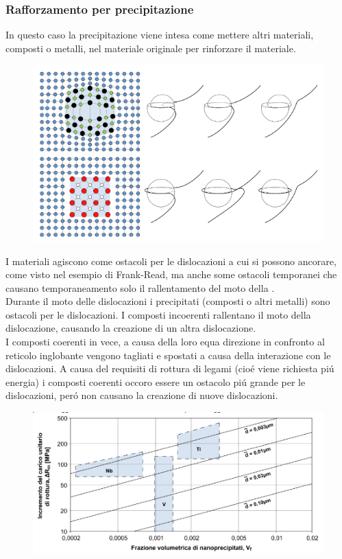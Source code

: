 \documentclass{article}
\begin{document}
            \subsubsection{Rafforzamento per precipitazione}
                In questo caso la precipitazione viene intesa come mettere altri materiali, composti o metalli, nel materiale originale per rinforzare il materiale.
                \begin{figure}
                    \centering
                    \includegraphics{Composti coerenti e incoerenti e la loro interazione con le dislocazioni.png}
                \end{figure}
                I materiali agiscono come ostacoli per le dislocazioni a cui si possono ancorare, come visto nel esempio di Frank-Read, ma anche some ostacoli temporanei che causano temporaneamento solo il rallentamento del moto della .\\
                Durante il moto delle dislocazioni i precipitati (composti o altri metalli) sono ostacoli per le dislocazioni. I composti incoerenti rallentano il moto della dislocazione, causando la creazione di un altra dislocazione.\\
                I composti coerenti in vece, a causa della loro equa direzione in confronto al reticolo inglobante vengono tagliati e spostati a causa della interazione con le dislocazioni. A causa del requisiti di rottura di legami (cio\'e viene richiesta pi\'u energia) i composti coerenti occoro essere un ostacolo pi\'u grande per le dislocazioni, per\'o non causano la creazione di nuove dislocazioni.\\
                \begin{figure}
                    \centering
                    \includegraphics{Diagramma collerazione tra finitura di matlli e l'aumento in resistenza nel materiale.png}
                \end{figure}
\end{document}
